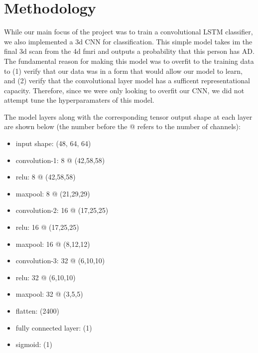 \documentclass[10pt]{article}
\begin{document}
	
	\section{Methodology}

	While our main focus of the project was to train a convolutional LSTM classifier, we also implemented a 3d CNN for classification. This simple model takes im the final 3d scan from the 4d fmri and outputs a probability that this person has AD. The fundamental reason for making this model was to overfit to the training data to (1) verify that our data was in a form that would allow our model to learn, and (2) verify that the convolutional layer model has a sufficent representational capacity. Therefore, since we were only looking to overfit our CNN, we did not attempt tune the hyperparamaters of this model. 
	
	The model layers along with the corresponding tensor output shape at each layer are shown below (the number before the @ refers to the number of channels):
		\begin{itemize}
			\item input shape: (48, 64, 64)
			\item convolution-1: 8 @ (42,58,58)
			\item relu: 8 @ (42,58,58)
			\item maxpool: 8 @ (21,29,29)
			\item convolution-2: 16 @ (17,25,25)
			\item relu: 16 @ (17,25,25)
			\item maxpool: 16 @ (8,12,12)
			\item convolution-3: 32 @ (6,10,10)
			\item relu: 32 @ (6,10,10)
			\item maxpool: 32 @ (3,5,5)
			\item flatten: (2400)
			\item fully connected layer: (1)
			\item sigmoid: (1)
		\end{itemize}
		
\end{document}
